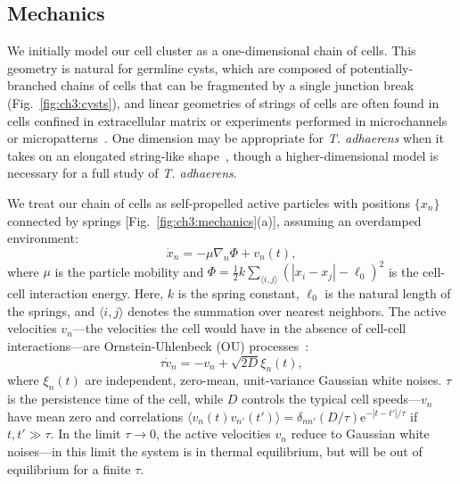 \subsection{Mechanics}
\label{sec:ch3:mechanics}

We initially model our cell cluster as a one-dimensional chain of cells. This geometry is natural for germline cysts, which are composed of potentially-branched chains of cells that can be fragmented by a single junction break (Fig.~\ref{fig:ch3:cysts}), and linear geometries of strings of cells are often found in cells confined in extracellular matrix or experiments performed in microchannels or micropatterns~\cite{law2023cytokinesis,wang2025confinement,desai2013contact,jain2020role}. One dimension may be appropriate for \textit{T. adhaerens} when it takes on an elongated string-like shape~\cite{prakash2021motility}, though a higher-dimensional model is necessary for a full study of \textit{T. adhaerens}.

We treat our chain of cells as self-propelled active particles with positions $\{x_n\}$ connected by springs [Fig.~\ref{fig:ch3:mechanics}(a)], assuming an overdamped environment:
\begin{equation}\label{eq:ch3:EOM}
    \dot{x}_n = -\mu \nabla_n\Phi +v_n(t),
\end{equation}
where $\mu$ is the particle mobility and $\Phi=\frac{1}{2}k\sum_{\langle i,j\rangle} \left(|x_i-x_j|-\ell_0\right)^2$ is the cell-cell interaction energy. Here, $k$ is the spring constant, $\ell_0$ is the natural length of the springs, and $\langle i,j\rangle$ denotes the summation over nearest neighbors. The active velocities $v_n$---the velocities the cell would have in the absence of cell-cell interactions---are Ornstein-Uhlenbeck (OU) processes~\cite{dunn1987unified}:
\begin{equation}
    \tau \dot{v}_n = -v_n+\sqrt{2D}\xi_n(t),
\end{equation}
where $\xi_n(t)$ are independent, zero-mean, unit-variance Gaussian white noises. $\tau$ is the persistence time of the cell, while $D$ controls the typical cell speeds---$v_n$ have mean zero and correlations $\langle v_n(t)v_{n'}(t') \rangle= \delta_{nn'}(D/\tau)\mathrm{e}^{-|t-t'|/\tau}$ if $t,t' \gg \tau$. In the limit $\tau\to 0$, the active velocities $v_n$ reduce to Gaussian white noises---in this limit the system is in thermal equilibrium, but will be out of equilibrium for a finite $\tau$.


